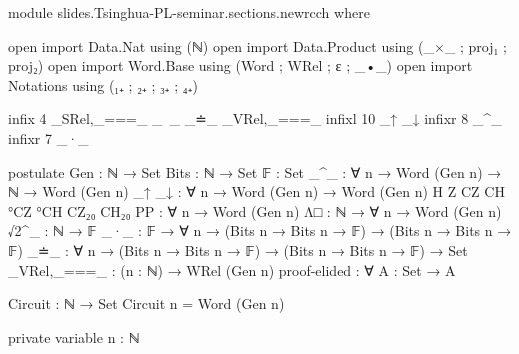 \begin{code}[hide]
module slides.Tsinghua-PL-seminar.sections.newrcch where

open import Data.Nat using (ℕ)
open import Data.Product using (_×_ ; proj₁ ; proj₂)
open import Word.Base using (Word ; WRel ; ε ; _•_)
open import Notations using (₁₊ ; ₂₊ ; ₃₊ ; ₄₊)

infix 4 _SRel,_===_ _~_ _≐_ _VRel,_===_
infixl 10 _↑ _↓
infixr 8 _^_
infixr 7 _·_

postulate
  Gen : ℕ → Set
  Bits : ℕ → Set
  𝔽 : Set
  _^_ : ∀ {n} → Word (Gen n) → ℕ → Word (Gen n)
  _↑ _↓ : ∀ {n} → Word (Gen n) → Word (Gen n)
  H Z CZ CH °CZ °CH CZ₂₀ CH₂₀ PP : ∀ {n} → Word (Gen n)
  Λ□ : ℕ → ∀ {n} → Word (Gen n)
  √2^_ : ℕ → 𝔽
  _·_ : 𝔽 → ∀ {n} → (Bits n → Bits n → 𝔽) → (Bits n → Bits n → 𝔽)
  _≐_ : ∀ {n} → (Bits n → Bits n → 𝔽) → (Bits n → Bits n → 𝔽) → Set
  _VRel,_===_ : (n : ℕ) → WRel (Gen n)
  proof-elided : ∀ {A : Set} → A

Circuit : ℕ → Set
Circuit n = Word (Gen n)

private variable
  n : ℕ
\end{code}

